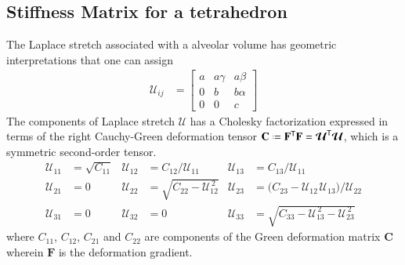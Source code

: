 \subsection{Stiffness Matrix for a tetrahedron}
The Laplace stretch associated with a alveolar volume has geometric interpretations that one can assign \cite{FreedSrinivasa15}
\begin{subequations}
	\label{LagrangianPhysicalStretch}
	\begin{align}
	\mathcal{U}_{ij} & = \begin{bmatrix}
	a & a \gamma & a \beta \\
	0 & b & b \alpha \\
	0 & 0 & c \end{bmatrix} 
	\end{align}
\end{subequations}
The components of Laplace stretch $\boldsymbol{\mathcal{U}}$ has a  Cholesky factorization expressed in terms of the right Cauchy-Green deformation tensor $\mathbf{C} \defeq \mathbf{F}^{\mathsf{T}} \mathbf{F} = \boldsymbol{\mathcal{U}}^{\mathsf{T}} \boldsymbol{\mathcal{U}}$, which is a symmetric second-order tensor. 
\begin{equation}
\begin{aligned}
\mathcal{U}_{11} & = \sqrt{C_{11}} & 
\mathcal{U}_{12} & = C_{12} / \mathcal{U}_{11} &
\mathcal{U}_{13} & = C_{13} / \mathcal{U}_{11} \\
\mathcal{U}_{21} & = 0 &
\mathcal{U}_{22} & = \sqrt{C_{22} - \mathcal{U}_{12}^{\,2}} &
\mathcal{U}_{23} & = \bigl( C_{23} - \mathcal{U}_{12\,}\mathcal{U}_{13} \bigr) / \mathcal{U}_{22} \\
\mathcal{U}_{31} & = 0 &
\mathcal{U}_{32} & = 0 & 
\mathcal{U}_{33} & = \sqrt{C_{33} - \mathcal{U}_{13}^{\,2} - \mathcal{U}_{23}^{\,2}}
\end{aligned}
\label{LagrangianLaplaceStretch}
\end{equation}
where ${C_{11}}$, ${C_{12}}$, ${C_{21}}$ and ${C_{22}}$ are components of the Green deformation matrix $\mathbf{C}$ wherein  $\mathbf{F}$ is the deformation gradient.
